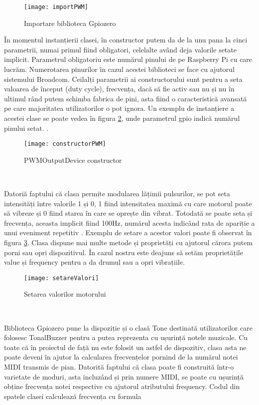 \documentclass[../IoMusT.tex]{subfiles}
\begin{document}
\begin{figure}[h]
\centering
\texttt{[image: importPWM]}
\caption{Importare biblioteca Gpiozero}
\label{fig:import}
\end{figure}
În momentul instanțierii clasei, în constructor putem da de la unu pana la cinci parametrii, numai primul fiind obligatori, celelalte având deja valorile setate implicit. Parametrul obligatoriu este numărul pinului de pe Raspberry Pi cu care lucrăm. Numerotarea pinurilor în cazul acestei biblioteci se face cu ajutorul sistemului Broadcom. Ceilalți parametrii ai constructorului sunt pentru a seta valoarea de început (duty cycle), frecvența, dacă să fie activ sau nu și nu în ultimul rând putem schimba fabrica de pini, asta fiind o caracteristică avansată pe care majoritatea utilizatorilor o pot ignora. Un exemplu de instanțiere a acestei clase se poate vedea în figura \ref{fig:constructor}, unde parametrul gpio indică numărul pinului setat. .
\begin{figure}[h]
\centering
\texttt{[image: constructorPWM]}
\caption{PWMOutputDevice constructor}
\label{fig:constructor}
\end{figure}
\\
\par Datoriă faptului că clasa permite modularea lățimii pulsurilor, se pot seta intensități între valorile 1 și 0, 1 fiind intensitatea maximă cu care motorul poate să vibreze și 0 fiind starea în care se oprește din vibrat. Totodată se poate seta și frecvența, aceasta implicit fiind 100Hz, numărul acesta indicând rata de apariție a unui eveniment repetitiv \cite{Freq}. Exemplu de setare a acestor valori poate fi observat în figura \ref{fig:val}. Clasa dispune mai multe metode și proprietăți cu ajutorul cărora putem porni sau opri dispozitivul. În cazul nostru este deajuns să setăm proprietățile value și frequency pentru a da drumul sau a opri vibrațiile. 
\begin{figure}[h]
\centering
\texttt{[image: setareValori]}
\caption{Setarea valorilor motorului}
\label{fig:val}
\end{figure}
\\
\par Biblioteca Gpiozero pune la dispoziție și o clasă Tone destinată utilizatorilor care folosesc TonalBuzzer pentru a putea reprezenta cu ușurință notele muzicale. Cu toate că în proiectul de față nu este folosit un astfel de dispozitiv, clasa asta ne poate deveni în ajutor la calcularea frecvențelor pornind de la numărul notei MIDI transmis de pian. Datorită faptului că clasa poate fi construită într-o varietate de moduri, asta incluzând și prin numere MIDI, se poate cu ușurință obține frecvența notei respective cu ajutorul atributului frequency. Codul din spatele clasei calculează frecvența cu formula
\end{document}
